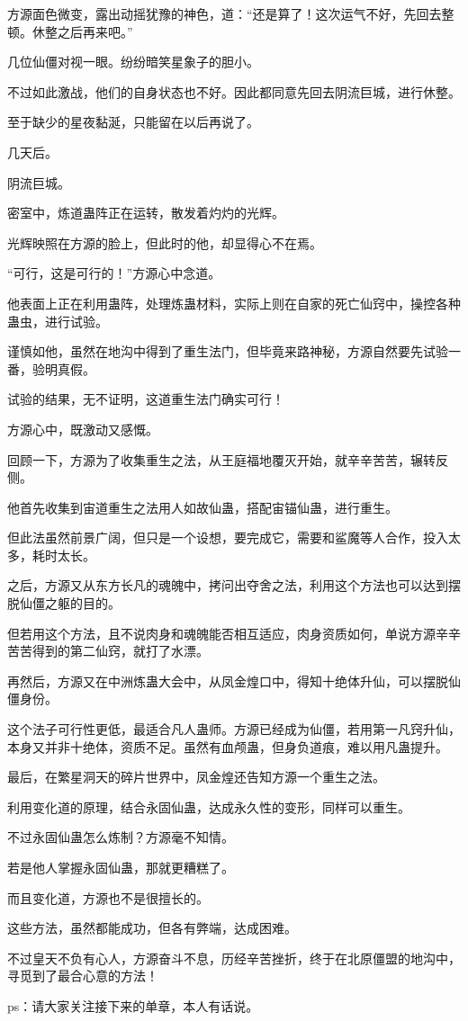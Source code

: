 \begin{this_body}
方源面色微变，露出动摇犹豫的神色，道：“还是算了！这次运气不好，先回去整顿。休整之后再来吧。”

几位仙僵对视一眼。纷纷暗笑星象子的胆小。

不过如此激战，他们的自身状态也不好。因此都同意先回去阴流巨城，进行休整。

至于缺少的星夜黏涎，只能留在以后再说了。

几天后。

阴流巨城。

密室中，炼道蛊阵正在运转，散发着灼灼的光辉。

光辉映照在方源的脸上，但此时的他，却显得心不在焉。

“可行，这是可行的！”方源心中念道。

他表面上正在利用蛊阵，处理炼蛊材料，实际上则在自家的死亡仙窍中，操控各种蛊虫，进行试验。

谨慎如他，虽然在地沟中得到了重生法门，但毕竟来路神秘，方源自然要先试验一番，验明真假。

试验的结果，无不证明，这道重生法门确实可行！

方源心中，既激动又感慨。

回顾一下，方源为了收集重生之法，从王庭福地覆灭开始，就辛辛苦苦，辗转反侧。

他首先收集到宙道重生之法用人如故仙蛊，搭配宙锚仙蛊，进行重生。

但此法虽然前景广阔，但只是一个设想，要完成它，需要和鲨魔等人合作，投入太多，耗时太长。

之后，方源又从东方长凡的魂魄中，拷问出夺舍之法，利用这个方法也可以达到摆脱仙僵之躯的目的。

但若用这个方法，且不说肉身和魂魄能否相互适应，肉身资质如何，单说方源辛辛苦苦得到的第二仙窍，就打了水漂。

再然后，方源又在中洲炼蛊大会中，从凤金煌口中，得知十绝体升仙，可以摆脱仙僵身份。

这个法子可行性更低，最适合凡人蛊师。方源已经成为仙僵，若用第一凡窍升仙，本身又并非十绝体，资质不足。虽然有血颅蛊，但身负道痕，难以用凡蛊提升。

最后，在繁星洞天的碎片世界中，凤金煌还告知方源一个重生之法。

利用变化道的原理，结合永固仙蛊，达成永久性的变形，同样可以重生。

不过永固仙蛊怎么炼制？方源毫不知情。

若是他人掌握永固仙蛊，那就更糟糕了。

而且变化道，方源也不是很擅长的。

这些方法，虽然都能成功，但各有弊端，达成困难。

不过皇天不负有心人，方源奋斗不息，历经辛苦挫折，终于在北原僵盟的地沟中，寻觅到了最合心意的方法！

ps：请大家关注接下来的单章，本人有话说。

\end{this_body}
